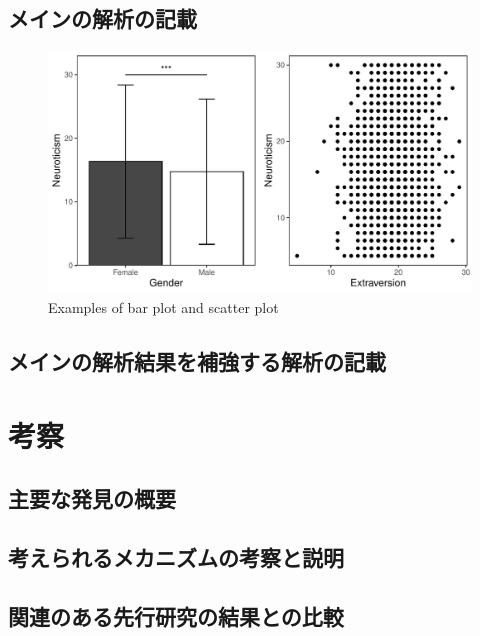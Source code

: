 \documentclass[12pt,a4paper,xelatex,ja=standard]{bxjsarticle}
\begin{document}
\subsection{メインの解析の記載}\label{ux30e1ux30a4ux30f3ux306eux89e3ux6790ux306eux8a18ux8f09}

\begin{figure}
\centering
\includegraphics{paper_files/figure-latex/figs-1.pdf}
\caption{\label{fig:figs}Examples of bar plot and scatter plot}
\end{figure}

\subsection{メインの解析結果を補強する解析の記載}\label{ux30e1ux30a4ux30f3ux306eux89e3ux6790ux7d50ux679cux3092ux88dcux5f37ux3059ux308bux89e3ux6790ux306eux8a18ux8f09}

\clearpage

\section{考察}\label{ux8003ux5bdf}

\subsection{主要な発見の概要}\label{ux4e3bux8981ux306aux767aux898bux306eux6982ux8981}

\subsection{考えられるメカニズムの考察と説明}\label{ux8003ux3048ux3089ux308cux308bux30e1ux30abux30cbux30baux30e0ux306eux8003ux5bdfux3068ux8aacux660e}

\subsection{関連のある先行研究の結果との比較}\label{ux95a2ux9023ux306eux3042ux308bux5148ux884cux7814ux7a76ux306eux7d50ux679cux3068ux306eux6bd4ux8f03}
\end{document}
